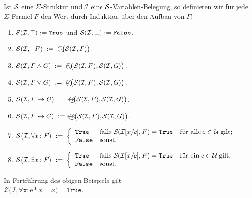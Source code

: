 \begin{Definition}
    Ist $\mathcal{S}$ eine $\Sigma$-Struktur und $\mathcal{I}$ eine $\mathcal{S}$-Variablen-Belegung,
    so definieren wir für jede $\Sigma$-Formel $F$ den Wert 
    durch Induktion über den Aufbau von $F$:
    \begin{enumerate}
    \item $\mathcal{S}(\mathcal{I},\top) := \mathtt{True}$ und $\mathcal{S}(\mathcal{I},\bot) := \mathtt{False}$.
    \item $\struct(\mathcal{I}, \neg F) \;:=\; \circneg\bigl(\struct(\mathcal{I}, F)\bigr)$.
    \item $\struct(\mathcal{I}, F \wedge G) \;:=\; \circwedge\bigl(\struct(\mathcal{I}, F), \struct(\mathcal{I}, G)\bigr)$.
    \item $\struct(\mathcal{I}, F \vee G) \;:=\; \circvee\bigl(\struct(\mathcal{I}, F), \struct(\mathcal{I}, G)\bigr)$.
    \item $\struct(\mathcal{I}, F \rightarrow G) \;:=\; \circright\!\bigl(\struct(\mathcal{I}, F), \struct(\mathcal{I}, G)\bigr)$.
    \item $\struct(\mathcal{I}, F \leftrightarrow G) \;:=\; \circleftright\bigl(\struct(\mathcal{I}, F), \struct(\mathcal{I}, G)\bigr)$.
    \item $\mathcal{S}\bigl(\mathcal{I}, \forall x\colon F\bigr) \;:=\; \left\{
      \begin{array}{ll}
         \mathtt{True}  & \mbox{falls}\; \mathcal{S}(\mathcal{I}[x/c], F) = \mathtt{True}\quad \mbox{für alle}\; c\in \mathcal{U}\;\mbox{gilt}; \\
         \mathtt{False} & \mbox{sonst}.
      \end{array}
      \right.$
    \item $\mathcal{S}\bigl(\mathcal{I}, \exists x \colon F\bigr) \;:=\; \left\{
      \begin{array}{ll}
         \mathtt{True}  & \mbox{falls}\; \mathcal{S}(\mathcal{I}[x/c], F) = \mathtt{True}\quad \mbox{für ein}\; c\in \mathcal{U}\;\mbox{gilt}; \\
         \mathtt{False} & \mbox{sonst}.
      \end{array}
      \right.$\eox    
    \end{enumerate}
\end{Definition}

\example
In Fortführung des obigen Beispiels gilt \\[0.2cm]
\hspace*{1.3cm}  $\mathcal{Z}\bigl(\mathcal{I}, \forall \mathtt{x}: \mathrm{e} * x = x \bigr) = \mathtt{True}$.
\eox

